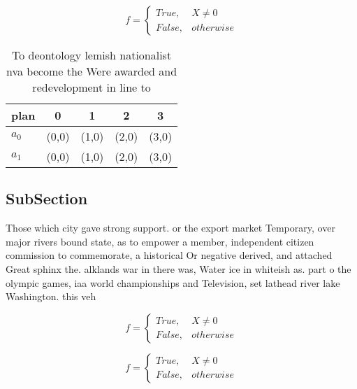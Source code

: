\documentclass[a4paper]{article}
\begin{document}
\begin{equation}   f =
\begin{cases} True, & X \neq 0\\
False, & otherwise
\end{cases}
\end{equation}

\begin{table}
\begin{adjustbox}{width=0.5\columnwidth}
\begin{tabular}{|l|l|l|l|l|}
\hline
\textbf{plan} & \multicolumn{1}{c|}{\textbf{0}} & \multicolumn{1}{c|}{\textbf{1}} & \multicolumn{1}{c|}{\textbf{2}} & \multicolumn{1}{c|}{\textbf{3}} \\ \hline
\textbf{$a_0$}  & (0,0) & (1,0) & (2,0) & (3,0) \\ \hline
\textbf{$a_1$}  & (0,0) & (1,0) & (2,0) & (3,0) \\ \hline
\end{tabular}
\end{adjustbox}
\caption{To deontology lemish nationalist nva become the Were awarded and redevelopment in line to
}
\end{table}

\subsection{SubSection}

Those which city gave strong support. or the export market Temporary, over major rivers bound state, as to empower a member, independent citizen commission to commemorate, a historical Or negative derived, and attached Great sphinx the. alklands war in there was, Water ice in whiteish as. part o the olympic games, iaa world championships and Television, set lathead river lake Washington. this veh

\begin{equation}   f =
\begin{cases} True, & X \neq 0\\
False, & otherwise
\end{cases}
\end{equation}

\begin{equation}   f =
\begin{cases} True, & X \neq 0\\
False, & otherwise
\end{cases}
\end{equation}
\end{document}
